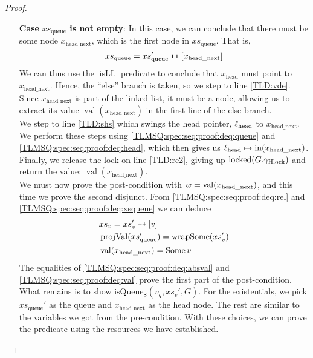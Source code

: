 \documentclass[a4paper, 10pt]{report}
\theoremstyle{definition}
\newcommand{\locked}{\operatorname{locked}}
\newcommand{\isqueueseq}{\operatorname{isQueue_{S}}}
\newcommand{\vq}{v_q}
\newcommand{\xsqueue}{xs_{\mathrm{queue}}}
\newcommand{\isLL}{\operatorname{isLL}}
\newcommand{\projval}{\operatorname{projVal}}
\newcommand{\wrapsome}{\operatorname{wrapSome}}
\newcommand{\locN}[1]{\loc_{\mathrm{#1}}}
\newcommand{\lochead}{\locN{head}}
\newcommand{\nodeval}{\valB}
\newcommand{\nIn}[1]{\operatorname{in}(#1)}
\newcommand{\nVal}[1]{\operatorname{val}(#1)}
\newcommand{\node}{x}
\newcommand{\nodeN}[1]{\node_{\mathrm{#1}}}
\newcommand{\nodehead}{\nodeN{head}}
\newcommand{\nodeheadnext}{\nodeN{head\_next}}
\newcommand{\absvalue}{\val}
\newcommand{\absvalueList}{xs_v}
\newcommand{\Qg}{G}
\newcommand{\ghlock}{\gname_{\mathrm{Hlock}}}
\newcommand\catenate{\mathbin{\text{\ttfamily\upshape ++}}}
\begin{document}
\begin{proof}
\begin{itemize}
  In this case, \ref{TLMSQ:spec:seq:proof:deq:isLL} simply asserts $\isLL [\nodehead]$, which by definition tells us that $\nodehead \mapsto \None$. Hence, the ``if'' on line \ref{TLD:ifn} takes the ``then'' branch, so we step to line \ref{TLD:re1}. Here we release the lock, giving up $\locked(\Qg.\ghlock)$, and return $\None$ on the next line. What remains is to prove the post-condition with $\nodeval = \None$. We can easily do this by proving the first disjunction. From \ref{TLMSQ:spec:seq:proof:deq:rel} with the fact that $\xsqueue = []$ we can conclude that $\absvalueList$ is empty, and since we have not modified the queue, we can prove $\isqueueseq(\vq, \absvalueList, \Qg)$ using the same resources we got from the pre-condition.

  \item[\textbf{Case}] \textbf{$\xsqueue$ is not empty}:
  In this case, we can conclude that there must be some node $\nodeheadnext$, which is the first node in $\xsqueue$. That is,
  \begin{equation}
    \xsqueue = \xsqueue' \catenate [\nodeheadnext]\label{TLMSQ:spec:seq:proof:deq:xsqueue}
  \end{equation}
  We can thus use the $\isLL$ predicate to conclude that $\nodehead$ must point to $\nodeheadnext$. Hence, the ``else'' branch is taken, so we step to line \ref{TLD:vde}. Since $\nodeheadnext$ is part of the linked list, it must be a node, allowing us to extract its value $\nVal{\nodeheadnext}$ in the first line of the else branch.\\
  We step to line \ref{TLD:shs} which swings the head pointer, $\lochead$ to $\nodeheadnext$. We perform these steps using \ref{TLMSQ:spec:seq:proof:deq:queue} and \ref{TLMSQ:spec:seq:proof:deq:head}, which then gives us $\lochead \mapsto \nIn{\nodeheadnext}$.\\
  Finally, we release the lock on line \ref{TLD:re2}, giving up $\locked(\Qg.\ghlock)$ and return the value: $\nVal{\nodeheadnext}$.\\
  We must now prove the post-condition with $\nodeval = \nVal{\nodeheadnext}$, and this time we prove the second disjunct. From \ref{TLMSQ:spec:seq:proof:deq:rel} and \ref{TLMSQ:spec:seq:proof:deq:xsqueue} we can deduce
  \begin{align}
    &\absvalueList = \absvalueList' \catenate [\absvalue]\label{TLMSQ:spec:seq:proof:deq:absval}\\
    &\projval(\xsqueue') = \wrapsome(\absvalueList')\label{TLMSQ:spec:seq:proof:deq:rel'}\\
    &\nVal{\nodeheadnext} = \Some{\absvalue}\label{TLMSQ:spec:seq:proof:deq:val}
  \end{align}
  The equalities of \ref{TLMSQ:spec:seq:proof:deq:absval} and \ref{TLMSQ:spec:seq:proof:deq:val} prove the first part of the post-condition. What remains is to show $\isqueueseq(\vq, \absvalueList', \Qg)$. For the existentials, we pick $\xsqueue'$ as the queue and $\nodeheadnext$ as the head node. The rest are similar to the variables we got from the pre-condition. With these choices, we can prove the predicate using the resources we have established.
\end{itemize}
\end{proof}
\end{document}
